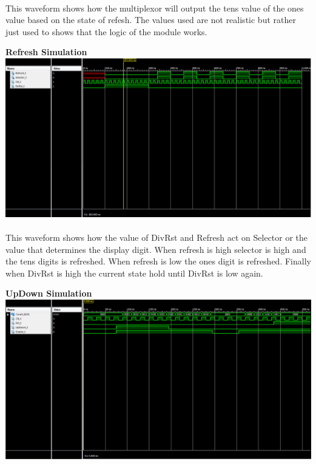 \documentclass[12pt]{report}
\begin{document}
				\paragraph*{}
				This waveform shows how the multiplexor will output the tens value of the ones value based on the state of refesh.  The values used are not realistic but rather just used to shows that the logic of the module works.
				
			\begin{center}
				\textbf{Refresh Simulation}
				\includegraphics[scale=.45]{re.PNG}
			\end{center}
				\paragraph*{}
				This waveform shows how the value of DivRst and Refresh act on Selector or the value that determines the display digit.  When refresh is high selector is high and the tens digits is refreshed.  When refresh is low the ones digit is refreshed.  Finally when DivRst is high the current state hold until DivRst is low again.
			
			\begin{center}
				\textbf{UpDown Simulation}
				\includegraphics[scale=.45]{cnt.PNG}
			\end{center}
\end{document}
